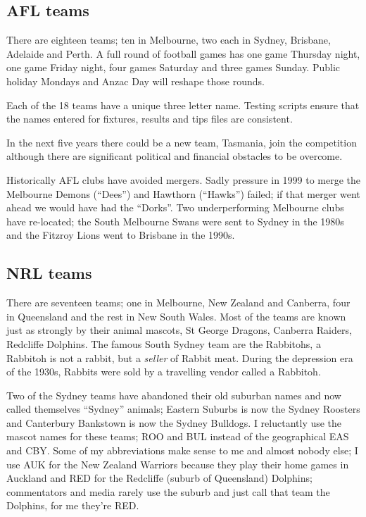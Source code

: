 \documentclass{article}
\begin{document}
\subsection{AFL teams}

There are eighteen teams; ten in Melbourne, two each in Sydney, Brisbane,
Adelaide and Perth. A full round of football games has one game
Thursday night, one game Friday night, four games Saturday and three
games Sunday. Public holiday Mondays and Anzac Day will reshape those
rounds.

Each of the 18 teams have a unique three letter name. Testing scripts
ensure that the names entered for fixtures, results and tips files are
consistent.

In the next five years there could be a new team, Tasmania, join the
competition although there are significant political and financial
obstacles to be overcome.

Historically AFL clubs have avoided mergers. Sadly pressure in 1999 to
merge the Melbourne Demons (``Dees'') and Hawthorn (``Hawks'')
failed; if that merger went ahead we would have had the ``Dorks''.
Two underperforming Melbourne clubs have re-located; the South
Melbourne Swans were sent to Sydney in the 1980s and the Fitzroy Lions
went to Brisbane in the 1990s.

\subsection{NRL teams}

There are seventeen teams; one in Melbourne, New Zealand and Canberra,
four in Queensland and the rest in New South Wales.
Most of the teams are known just as strongly
by their animal mascots, St George Dragons, Canberra Raiders,
Redcliffe Dolphins. The famous South Sydney team are the Rabbitohs, a
Rabbitoh is not a rabbit, but a \textit{seller} of Rabbit meat. During
the depression era of the 1930s, Rabbits were sold by a travelling
vendor called a Rabbitoh.

Two of the Sydney teams have abandoned their old suburban names
and now called themselves ``Sydney'' animals; Eastern Suburbs is now
the Sydney Roosters and Canterbury Bankstown is now the Sydney
Bulldogs. I reluctantly use the mascot names for these teams; ROO and
BUL instead of the geographical EAS and CBY. Some of my abbreviations
make sense to me and almost nobody else; I use AUK for the New Zealand
Warriors because they play their home games in Auckland and RED for
the Redcliffe (suburb of Queensland) Dolphins; commentators and media
rarely use the suburb and just call that team the Dolphins, for me
they're RED.
\end{document}
